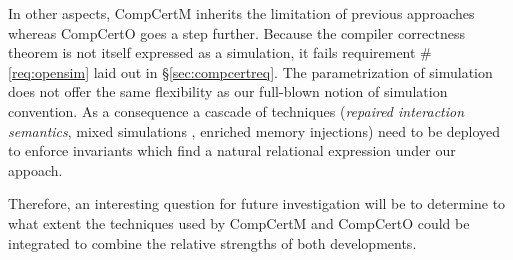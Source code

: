\documentclass[sigplan,10pt,review,anonymous]{acmart}
\begin{document}
In other aspects,
CompCertM inherits the limitation of previous approaches
whereas CompCertO goes a step further.
Because the compiler correctness theorem
is not itself expressed as a simulation,
it fails requirement \#\ref{req:opensim}
laid out in \S\ref{sec:compcertreq}.
The parametrization of simulation
does not offer the same flexibility as
our full-blown notion of simulation convention.
As a consequence a cascade of techniques
(\emph{repaired interaction semantics},
mixed simulations \cite{pilsner},
enriched memory injections)
need to be deployed to enforce invariants
which find a natural relational expression
under our appoach.

Therefore,
an interesting question for future investigation
will be to determine to what extent
the techniques used by CompCertM and CompCertO
could be integrated to combine
the relative strengths of both developments.






\end{document}
